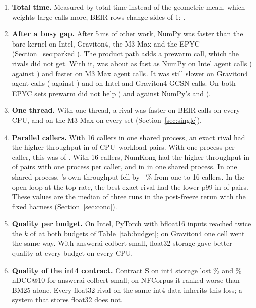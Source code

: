 \begin{enumerate}
\item \textbf{Total time.} Measured by total time instead of the geometric mean, which weights large calls more,  BEIR rows change sides of 1: .
\item \textbf{After a busy gap.} After 5\,ms of other work, NumPy was faster than the bare kernel on Intel, Graviton4, the M3 Max and the EPYC (Section~\ref{sec:parked}). The product path adds a prewarm call, which the rivals did not get. With it, \sweet was about as fast as NumPy on Intel agent calls ( against ) and faster on M3 Max agent calls. It was still slower on Graviton4 agent calls ( against ) and on Intel and Graviton4 GCSN calls. On both EPYC sets prewarm did not help ( and  against NumPy's  and ).
\item \textbf{One thread.} With one thread, a rival was faster on BEIR calls on every CPU, and on the M3 Max on every set (Section~\ref{sec:single}).
\item \textbf{Parallel callers.} With 16 callers in one shared process, an exact rival had the higher throughput in  of  CPU--workload pairs. With one process per caller, this was  of . With 16 callers, NumKong had the higher throughput in  of  pairs with one process per caller, and in  in one shared process. In one shared process, \sweet's own throughput fell by --\% from one to 16 callers. In the open loop at the top rate, the best exact rival had the lower p99 in  of  pairs. These values are the median of three runs in the post-freeze rerun with the fixed harness (Section~\ref{sec:conc}).
\item \textbf{Quality per budget.} On Intel, PyTorch with bfloat16 inputs reached twice the $k$ of \sweet at both budgets of Table~\ref{tab:budget}; on Graviton4 one cell went the same way. With answerai-colbert-small, float32 storage gave better quality at every budget on every CPU.
\item \textbf{Quality of the int4 contract.} Contract S on int4 storage lost \% and \% nDCG@10 for answerai-colbert-small; on NFCorpus it ranked worse than BM25 alone. Every float32 rival on the same int4 data inherits this loss; a system that stores float32 does not.
\end{enumerate}


